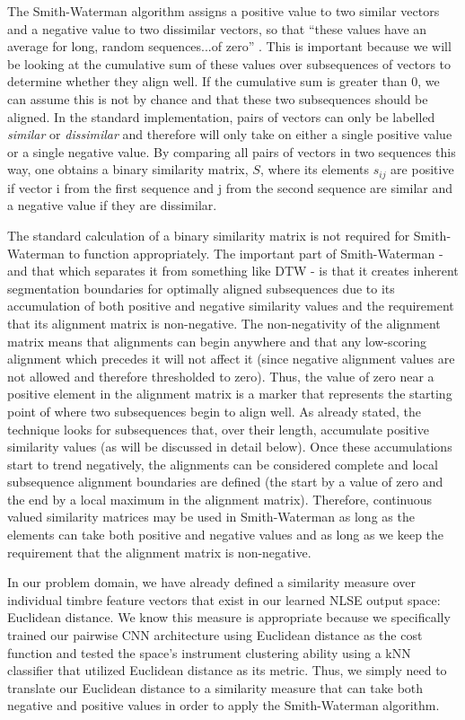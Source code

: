 \documentclass[12pt]{report} 	%
\numberwithin{figure}{chapter}
\numberwithin{table}{chapter}
\numberwithin{equation}{chapter}
\begin{document}
\begin{flushleft}
The Smith-Waterman algorithm assigns a positive value to two similar vectors and a negative value to two dissimilar vectors, so that ``these values have an average for long, random sequences...of zero'' \cite[p. 196]{smith1981textordfeminineidentification}. This is important because we will be looking at the cumulative sum of these values over subsequences of vectors to determine whether they align well. If the cumulative sum is greater than $0$, we can assume this is not by chance and that these two subsequences should be aligned. In the standard implementation, pairs of vectors can only be labelled \textit{similar} or \textit{dissimilar} and therefore will only take on either a single positive value or a single negative value. By comparing all pairs of vectors in two sequences this way, one obtains a binary similarity matrix, $S$, where its elements $s_{ij}$ are positive if vector i from the first sequence and j from the second sequence are similar and a negative value if they are dissimilar.

The standard calculation of a binary similarity matrix is not required for Smith-Waterman to function appropriately. The important part of Smith-Waterman - and that which separates it from something like DTW - is that it creates inherent segmentation boundaries for optimally aligned subsequences due to its accumulation of both positive and negative similarity values and the requirement that its alignment matrix is non-negative. The non-negativity of the alignment matrix means that alignments can begin anywhere and that any low-scoring alignment which precedes it will not affect it (since negative alignment values are not allowed and therefore thresholded to zero). Thus, the value of zero near a positive element in the alignment matrix is a marker that represents the starting point of where two subsequences begin to align well. As already stated, the technique looks for subsequences that, over their length, accumulate positive similarity values (as will be discussed in detail below). Once these accumulations start to trend negatively, the alignments can be considered complete and local subsequence alignment boundaries are defined (the start by a value of zero and the end by a local maximum in the alignment matrix). Therefore, continuous valued similarity matrices may be used in Smith-Waterman as long as the elements can take both positive and negative values and as long as we keep the requirement that the alignment matrix is non-negative.

In our problem domain, we have already defined a similarity measure over individual timbre feature vectors that exist in our learned NLSE output space: Euclidean distance. We know this measure is appropriate because we specifically trained our pairwise CNN architecture using Euclidean distance as the cost function and tested the space's instrument clustering ability using a kNN classifier that utilized Euclidean distance as its metric. Thus, we simply need to translate our Euclidean distance to a similarity measure that can take both negative and positive values in order to apply the Smith-Waterman algorithm. 


\end{flushleft}
\end{document}
